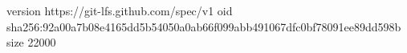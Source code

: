 version https://git-lfs.github.com/spec/v1
oid sha256:92a00a7b08e4165dd5b54050a0ab66f099abb491067dfc0bf78091ee89dd598b
size 22000
